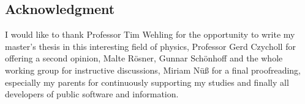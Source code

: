 
\begin{center}
    \begin{minipage}{2\textwidth/3}
        \chapter{Acknowledgment}

        I would like to thank Professor Tim Wehling for the opportunity to write
        my master's thesis in this interesting field of physics, Professor Gerd
        Czycholl for offering a second opinion, Malte Rösner, Gunnar Schönhoff
        and the whole working group for instructive discussions, Miriam Nüß for
        a final proofreading, especially my parents for continuously supporting
        my studies and finally all developers of public software and
        information.
    \end{minipage}
\end{center}

